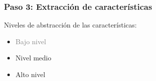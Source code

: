 \documentclass[
10pt, %
aspectratio=169, %
]{beamer}
\begin{document}
	\begin{frame}
		
		\frametitle{Paso 3: Extracción de características}
		
		Niveles de abstracción de las características:
		\begin{itemize}
			\item \textcolor{gray}{Bajo nivel}
		
			\item Nivel medio
			
			
			\item Alto nivel
			
		\end{itemize}
		
	\end{frame}
	
\end{document}
